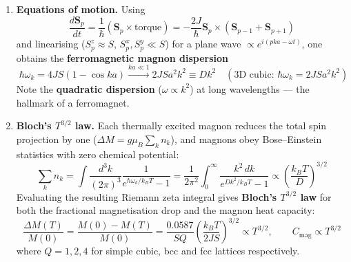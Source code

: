 \documentclass[11pt,a4paper]{article}
\newcommand{\vb}[1]{\mathbf{#1}}
\begin{document}
\begin{enumerate}[leftmargin=1.6cm]
    \item \textbf{Equations of motion.} Using
    \begin{equation}
        \frac{d\vb{S}_p}{dt} = \frac{1}{\hbar}\left(\vb{S}_p\times\text{torque}\right)
        = -\frac{2J}{\hbar}\vb{S}_p\times\left(\vb{S}_{p-1}+\vb{S}_{p+1}\right)
        \label{eq:magnoneom}
    \end{equation}
    and linearising ($S_p^z\approx S$, $S_p^x,S_p^y\ll S$) for a plane wave $\propto e^{i(pka-\omega t)}$, one obtains the \textbf{ferromagnetic magnon dispersion}
    \begin{equation}
        \boxed{\;\hbar\omega_k = 4JS(1-\cos ka)
        \xrightarrow{ka\ll1} 2JSa^2k^2 \equiv Dk^2
        \quad (\text{3D cubic: } \hbar\omega_k = 2JSa^2k^2)\;}
        \label{eq:magnondisp}
    \end{equation}
    Note the \textbf{quadratic dispersion} ($\omega\propto k^2$) at long wavelengths --- the hallmark of a ferromagnet.
    \item \textbf{Bloch's $T^{3/2}$ law.} Each thermally excited magnon reduces the total spin projection by one ($\Delta M = g\mu_B\sum_k n_k$), and magnons obey Bose--Einstein statistics with zero chemical potential:
    \begin{equation}
        \sum_k n_k = \int\frac{d^3k}{(2\pi)^3}\frac{1}{e^{\hbar\omega_k/k_BT}-1}
        = \frac{1}{2\pi^2}\int_0^\infty\frac{k^2\,dk}{e^{Dk^2/k_BT}-1}
        \propto \left(\frac{k_BT}{D}\right)^{3/2}
        \label{eq:magnonpop}
    \end{equation}
    Evaluating the resulting Riemann zeta integral gives \textbf{Bloch's $T^{3/2}$ law} for both the fractional magnetisation drop and the magnon heat capacity:
    \begin{equation}
        \boxed{\;\frac{\Delta M(T)}{M(0)} = \frac{M(0)-M(T)}{M(0)}
        = \frac{0.0587}{SQ}\left(\frac{k_BT}{2JS}\right)^{3/2}\propto T^{3/2},
        \qquad C_{\mathrm{mag}}\propto T^{3/2}\;}
        \label{eq:bloch}
    \end{equation}
    where $Q = 1, 2, 4$ for simple cubic, bcc and fcc lattices respectively.
\end{enumerate}
\end{document}
